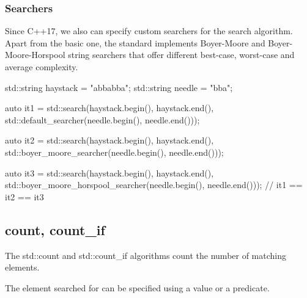 \subsubsection{Searchers}

Since C++17, we also can specify custom searchers for the search algorithm. Apart from the basic one, the standard implements Boyer-Moore and Boyer-Moore-Horspool string searchers that offer different best-case, worst-case and average complexity.

\begin{box-note}
\begin{cppcode}
std::string haystack = "abbabba";
std::string needle = "bba";

auto it1 = std::search(haystack.begin(), haystack.end(), 
                       std::default_searcher(needle.begin(), needle.end()));

auto it2 = std::search(haystack.begin(), haystack.end(), 
                       std::boyer_moore_searcher(needle.begin(), needle.end()));

auto it3 = std::search(haystack.begin(), haystack.end(), 
                       std::boyer_moore_horspool_searcher(needle.begin(), needle.end()));
// it1 == it2 == it3
\end{cppcode}
\end{box-note}

\subsection{count, count\_if}

The std::count and std::count\_if algorithms count the number of matching elements.



The element searched for can be specified using a value or a predicate.

\begin{box-note}
\end{box-note}

